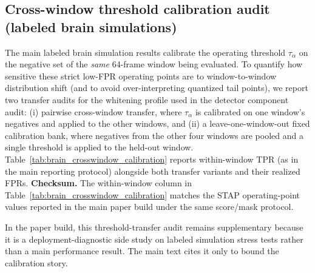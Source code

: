 \subsection{Cross-window threshold calibration audit (labeled brain simulations)}
\label{app:brain-crosswindow-calib}
\ifSTAPSUPPLEMENTONLY
The main labeled brain simulation results calibrate the operating threshold $\tau_\alpha$ on the negative set of the \emph{same} 64-frame window being evaluated. To quantify how sensitive these strict low-FPR operating points are to window-to-window distribution shift (and to avoid over-interpreting quantized tail points), we report two transfer audits for the whitening profile used in the detector component audit: (i) pairwise cross-window transfer, where $\tau_\alpha$ is calibrated on one window's negatives and applied to the other windows, and (ii) a leave-one-window-out fixed calibration bank, where negatives from the other four windows are pooled and a single threshold is applied to the held-out window. Table~\ref{tab:brain_crosswindow_calibration} reports within-window TPR (as in the main reporting protocol) alongside both transfer variants and their realized FPRs.
\noindent \textbf{Checksum.} The within-window column in Table~\ref{tab:brain_crosswindow_calibration} matches the STAP operating-point values reported in the main paper build under the same score/mask protocol.

\begin{table}[t]
\centering
\small
\begingroup
\setlength{\tabcolsep}{4pt}
\endgroup
\caption{Labeled brain simulation threshold-transfer audit for the whitening profile used in the detector component audit. ``Within-window'' matches the main reporting protocol (calibrate $\tau_\alpha$ on a window's negatives and evaluate on that same window). ``Pairwise cross'' calibrates $\tau_\alpha$ on one window and evaluates on a disjoint window ($n=20$ ordered window pairs). ``Fixed-cal-set'' uses a leave-one-window-out calibration bank: for each held-out window, pool negatives from the other four windows, calibrate $\tau_\alpha$ once, and evaluate on the held-out window ($n=5$). Reported values are median (IQR) over windows/pairs.}
\label{tab:brain_crosswindow_calibration}
\end{table}
\else
\noindent In the paper build, this threshold-transfer audit remains supplementary because it is a deployment-diagnostic side study on labeled simulation stress tests rather than a main performance result. The main text cites it only to bound the calibration story.
\fi

